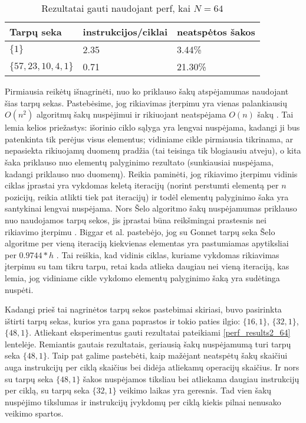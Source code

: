 \documentclass{VUMIFInfBakalaurinis}
\begin{document}
\begin{table}[H]
  \caption{Rezultatai gauti naudojant perf, kai $N = 64$}
  \label{perf_results_64}
  \centering
  \begin{tabular}{@{}lll@{}}
  Tarpų seka            & instrukcijos/ciklai     & neatspėtos šakos \\ \midrule
  $\{1\}$               & 2.35                    & 3.44\%           \\
  $\{57,23,10,4,1\}$    & 0.71                    & 21.30\%          \\ \bottomrule
  \end{tabular}
\end{table}


Pirmiausia reikėtų išnagrinėti, nuo ko priklauso šakų atspėjamumas naudojant šias tarpų sekas.
Pastebėsime, jog rikiavimas įterpimu yra vienas palankiausių $O(n^2)$ algoritmų šakų nuspėjimui
ir rikiuojant neatspėjama $O(n)$ šakų \cite{biggar2005sorting}.
Tai lemia kelios priežastys: išorinio ciklo sąlyga yra lengvai nuspėjama, kadangi ji bus patenkinta tik perėjus visus elementus;
vidiniame cikle pirmiausia tikrinama, ar nepasiekta rikiuojamų duomenų pradžia (tai teisinga tik blogiausiu atveju),
o kita šaka priklauso nuo elementų palyginimo rezultato (sunkiausiai nuspėjama, kadangi priklauso nuo duomenų).
Reikia paminėti, jog rikiavimo įterpimu vidinis ciklas įprastai yra vykdomas keletą iteracijų (norint perstumti elementą per $n$ pozicijų, reikia atlikti tiek pat iteracijų)
ir todėl elementų palyginimo šaka yra santykinai lengvai nuspėjama.
Nors Šelo algoritmo šakų nuspėjamumas priklauso nuo naudojamos tarpų sekos, jis įprastai būna reikšmingai prastesnis nei rikiavimo įterpimu \cite{biggar2005sorting}.
Biggar et al. pastebėjo, jog su Gonnet tarpų seka Šelo algoritme per vieną iteraciją kiekvienas elementas yra pastumiamas apytiksliai per $0.9744 * h$ \cite{biggar2008experimental}.
Tai reiškia, kad vidinis ciklas, kuriame vykdomas rikiavimas įterpimu su tam tikru tarpu, retai kada atlieka daugiau nei vieną iteraciją, kas lemia, jog
vidiniame cikle vykdomo elementų palyginimo šaką yra sudėtinga nuspėti.

Kadangi prieš tai nagrinėtos tarpų sekos pastebimai skiriasi, buvo pasirinkta ištirti tarpų sekas, kurios yra gana paprastos ir tokio paties ilgio: $\{16, 1\}$, $\{32, 1\}$, $\{48, 1\}$.
Atliekant eksperimentus gauti rezultatai pateikiami \ref{perf_results2_64} lentelėje.
Remiantis gautais rezultatais, geriausią šakų nuspėjamumą turi tarpų seka $\{48, 1\}$.
Taip pat galime pastebėti, kaip mažėjant neatspėtų šakų skaičiui auga instrukcijų per ciklą skaičius bei didėja atliekamų operacijų skaičius.
Ir nors su tarpų seka $\{48, 1\}$ šakos nuspėjamos tiksliau bei atliekama daugiau instrukcijų per ciklą, su tarpų seka $\{32, 1\}$ veikimo laikas yra geresnis.
Tad vien šakų nuspėjimo tikslumas ir instrukcijų įvykdomų per ciklą kiekis pilnai nenusako veikimo spartos. 
\end{document}

